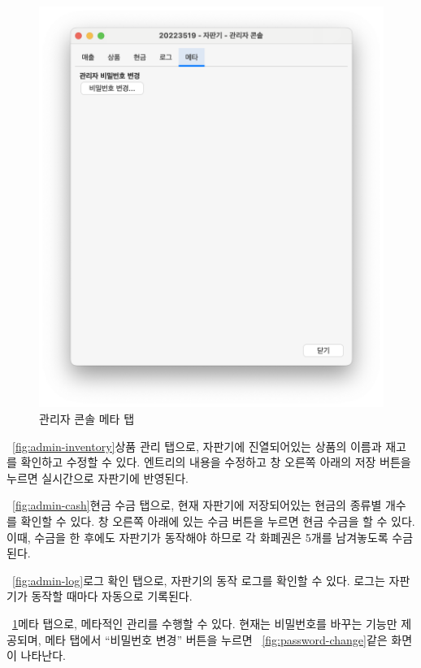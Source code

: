 \documentclass{oblivoir}
\newcommand{\figref}[1]{\figurename~\ref{#1}}
\begin{document}
\begin{figure}
\begin{minipage}{0.5\textwidth}
            \includegraphics[width=\textwidth]{images/snapshot/admin-meta}
            \caption{관리자 콘솔 메타 탭}
            \label{fig:admin-meta}
        \end{minipage}
    \end{figure}

    \figref{fig:admin-inventory}\는 상품 관리 탭으로,
    자판기에 진열되어있는 상품의 이름과 재고를 확인하고 수정할 수 있다.
    엔트리의 내용을 수정하고 창 오른쪽 아래의 저장 버튼을 누르면 실시간으로 자판기에 반영된다.

    \figref{fig:admin-cash}\는 현금 수금 탭으로,
    현재 자판기에 저장되어있는 현금의 종류별 개수를 확인할 수 있다.
    창 오른쪽 아래에 있는 수금 버튼을 누르면 현금 수금을 할 수 있다.
    이때, 수금을 한 후에도 자판기가 동작해야 하므로 각 화폐권은 5개를 남겨놓도록 수금된다.

    \figref{fig:admin-log}\는 로그 확인 탭으로,
    자판기의 동작 로그를 확인할 수 있다.
    로그는 자판기가 동작할 때마다 자동으로 기록된다.

    \figref{fig:admin-meta}\는 메타 탭으로,
    메타적인 관리를 수행할 수 있다.
    현재는 비밀번호를 바꾸는 기능만 제공되며, 메타 탭에서 ``비밀번호 변경\textellipsis'' 버튼을 누르면
    \figref{fig:password-change}\와 같은 화면이 나타난다.
\end{document}
